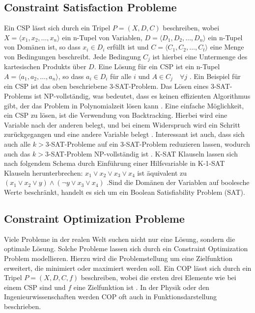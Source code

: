 \subsection{Constraint Satisfaction Probleme}
\label{sec:Constraint-Satisfaction-Probleme}

Ein CSP lässt sich durch ein Tripel \(P=(X,D,C)\) beschreiben, wobei \(X=\langle
x_{1},x_{2},\ldots,x_{n}\rangle\) ein n-Tupel von Variablen, \(D=\langle
D_{1},D_{2},\ldots,D_{n}\rangle\) ein n-Tupel von Domänen ist, so dass \(x_i\in
D_{i}\) erfüllt ist und \(C=\langle C_1,C_2,\ldots,C_t\rangle\) eine Menge von
Bedingungen beschreibt. Jede Bedingung \(C_j\) ist hierbei eine Untermenge des
kartesischen Produkts über \(D\). Eine Lösung für ein CSP ist ein n-Tupel
\(A=\langle a_1,a_2,\ldots,a_n\rangle \), so dass \(a_i\in D_i\) für alle \(i\)
und \(A \in C_j \quad \forall j\) \cite[16]{rossi06bo}. Ein Beispiel für ein CSP
ist das oben beschriebene 3-SAT-Problem. Das Lösen eines 3-SAT-Problems ist
NP-vollständig, was bedeutet, dass es keinen effizienten Algorithmus gibt, der
das Problem in Polynomialzeit lösen kann \cite[17]{rossi06bo}. Eine einfache
Möglichkeit, ein CSP zu lösen, ist die Verwendung von Backtracking. Hierbei wird
eine Variable nach der anderen belegt, und bei einem Widerspruch wird ein
Schritt zurückgegangen und eine andere Variable belegt \cite[85]{rossi06bo}.
Interessant ist auch, dass sich auch alle \(k>3\)-SAT-Probleme auf ein
3-SAT-Problem reduzieren lassen, wodurch auch das \(k>3\)-SAT-Problem
NP-vollständig ist \cite[206]{gritz13bo}. \mbox{K-SAT} Klauseln lassen sich nach
folgendem Schema durch Einführung einer Hilfsvariable in \mbox{K-1-SAT} Klauseln
herunterbrechen: $x_1 \vee x_2 \vee x_3 \vee x_4$ ist äquivalent zu $(x_1 \vee
x_2 \vee y) \wedge (\lnot y \vee x_3 \vee x_4)$ .Sind die Domänen der Variablen
auf boolesche Werte beschränkt, handelt es sich um ein Boolean Satisfiability
Problem (SAT).


\subsection{Constraint Optimization Probleme}
\label{sec:Constraint-Optimization-Probleme}

Viele Probleme in der realen Welt suchen nicht nur eine Lösung, sondern die
optimale Lösung. Solche Probleme lassen sich durch ein Constraint Optimization
Problem modellieren. Hierzu wird die Problemstellung um eine Zielfunktion
erweitert, die minimiert oder maximiert werden soll. Ein COP lässt sich durch
ein Tripel \(P=(X,D,C,f)\) beschreiben, wobei die ersten drei Elemente wie bei
einem CSP sind und \(f\) eine Zielfunktion ist \cite[22]{amadi15jo}. In der
Physik oder den Ingenieurwissenschaften werden COP oft auch in
Funktionsdarstellung beschrieben.

